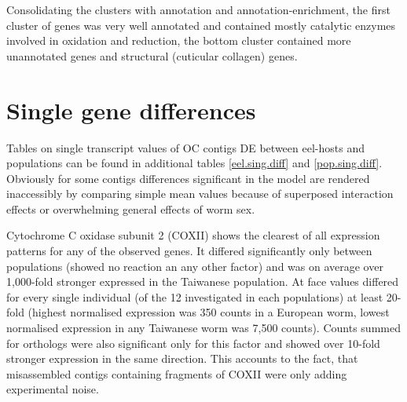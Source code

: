 Consolidating the clusters with annotation and annotation-enrichment,
the first cluster of genes was very well annotated and contained
mostly catalytic enzymes involved in oxidation and reduction, the
bottom cluster contained more unannotated genes and structural
(cuticular collagen) genes.

\section{Single gene differences}
\label{sec:single-gene-diff}

Tables on single transcript values of OC contigs DE between eel-hosts
and populations can be found in additional tables \ref{eel.sing.diff}
and \ref{pop.sing.diff}. Obviously for some contigs differences
significant in the model are rendered inaccessibly by comparing simple
mean values because of superposed interaction effects or overwhelming
general effects of worm sex.

Cytochrome C oxidase subunit 2 (COXII) shows the clearest of all
expression patterns for any of the observed genes. It differed
significantly only between populations (showed no reaction an any
other factor) and was on average over 1,000-fold stronger expressed in
the Taiwanese population. At face values differed for every single
individual (of the 12 investigated in each populations) at least
20-fold (highest normalised expression was 350 counts in a European
worm, lowest normalised expression in any Taiwanese worm was 7,500
counts). Counts summed for orthologs were also significant only for
this factor and showed over 10-fold stronger expression in the same
direction. This accounts to the fact, that misassembled contigs
containing fragments of COXII were only adding experimental noise.






